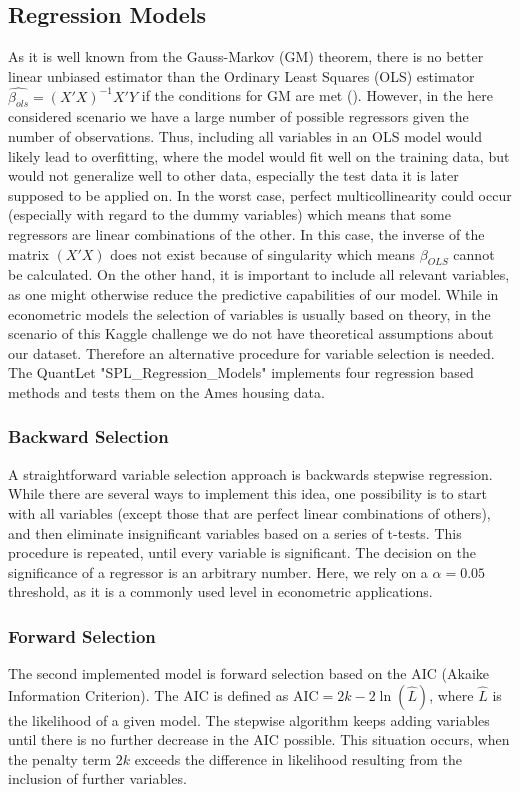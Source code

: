 \subsection{Regression Models} \label{sec:reg_theory}
As it is well known from the Gauss-Markov (GM) theorem, there is no better linear unbiased estimator than the Ordinary Least Squares (OLS) estimator $\hat{\beta_{ols}} = (X'X)^{-1}X'Y$  if the conditions for GM are met (\cite{wooldridge_introductory_2015}). However, in the here considered scenario we have a large number of possible regressors given the number of observations. Thus, including all variables in an OLS model would likely lead to overfitting, where the model would fit well on the training data, but would not generalize well to other data, especially the test data it is later supposed to be applied on. In the worst case, perfect multicollinearity could occur (especially with regard to the dummy variables)  which means that some regressors are linear combinations of the other. In this case, the inverse of the matrix $(X'X)$ does not exist  because of singularity which means $\beta_{OLS}$ cannot be calculated.  
On the other hand, it is important to include all relevant variables, as one  might otherwise reduce the predictive capabilities of our model. 
While in econometric models  the selection of variables is usually based on theory, in the scenario of this Kaggle challenge we do not have theoretical assumptions about our dataset. Therefore an alternative procedure for variable selection is needed. The QuantLet "SPL\_Regression\_Models"  implements four regression based methods and tests them on the Ames housing data. 

\subsubsection{Backward Selection}
A straightforward variable selection approach is backwards stepwise regression. While there are several ways to implement this idea, one possibility is to  start with all variables (except those that are perfect linear combinations of others), and then eliminate insignificant variables based on a series of  t-tests. This procedure is repeated, until every variable is significant. The decision on the significance of a regressor is an arbitrary number. Here, we rely on a $\alpha = 0.05$ threshold, as it is a commonly used level in econometric applications. 

\subsubsection{Forward Selection}
The second implemented model is forward selection based on the AIC (Akaike Information Criterion). The AIC is defined as 
${\displaystyle \mathrm{AIC}=2k-2\ln({\hat{L}})}$, where $\hat{L}$ is the likelihood of a given model. The stepwise algorithm keeps adding variables until there is no further decrease in the AIC possible. This situation occurs, when the penalty term $2k$ exceeds the difference in likelihood resulting from the inclusion of further variables. 

